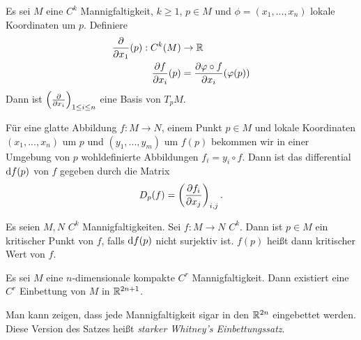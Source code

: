 \begin{remark}
    Es sei $M$ eine $C^k$ Mannigfaltigkeit, $k \geq 1$, $p \in M$ und $\phi = (x_1, ..., x_n)$
    lokale Koordinaten um $p$. Definiere
    \begin{align*} 
        \pderive{x_1}(p): C^k(M) & \to \R \\
        \pderive[f]{x_i} (p) & = \pderive[\phi \circ f]{x_i} (\phi(p))
    \end{align*}
    Dann ist $\left( \pderive{x_i} \right)_{1 \leq i \leq n}$ eine Basis von $T_pM$.

    Für eine glatte Abbildung $f \colon M \to N$, einem Punkt $p \in M$ und lokale Koordinaten 
    $(x_1, ..., x_n)$ um $p$ und $(y_1, ..., y_m)$ um $f(p)$ bekommen wir in einer Umgebung 
    von $p$ wohldefinierte Abbildungen $f_i = y_i \circ f$. Dann ist das differential 
    $\opd f (p)$ von $f$ gegeben durch die Matrix
    \[ D_p(f) = \left( \pderive[f_i]{x_j} \right)_{i,j} . \]
\end{remark}

\begin{definition}
    \label{anh.def: kritischer punkt}
    Es seien $M, N$ $C^k$ Mannigfaltigkeiten. Sei $f \colon M \to N$ $C^k$. Dann ist $p \in M$
    ein kritischer Punkt von $f$, falls $\opd f (p)$ nicht surjektiv ist. $f(p)$ heißt dann
    kritischer Wert von $f$.
\end{definition}

\begin{theorem}
    \label{anh.satz: whitneys einbettungssatz}
    Es sei $M$ eine $n$-dimensionale kompakte  
    $C^r$ Mannigfaltigkeit. Dann existiert eine $C^r$ Einbettung von $M$ in 
    $\R^{2n + 1}$.
\end{theorem}

\begin{remark}
    Man kann zeigen, dass jede Mannigfaltigkeit sigar in den $\R^{2n}$ eingebettet werden.
    Diese Version des Satzes heißt \textit{starker Whitney's Einbettungssatz}.
\end{remark}
